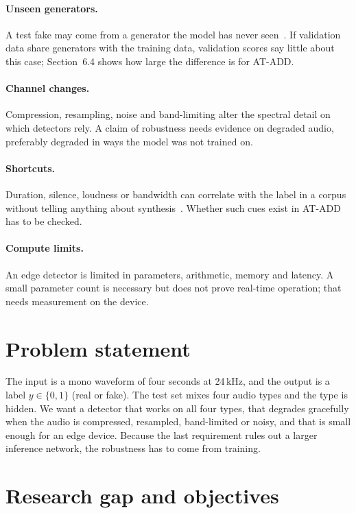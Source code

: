 \documentclass[12pt,a4paper]{report}
\begin{document}
\paragraph{Unseen generators.} A test fake may come from a generator the model has never seen~\cite{xie2026atadd}. If validation data share generators with the training data, validation scores say little about this case; Section~6.4 shows how large the difference is for AT-ADD.

\paragraph{Channel changes.} Compression, resampling, noise and band-limiting alter the spectral detail on which detectors rely. A claim of robustness needs evidence on degraded audio, preferably degraded in ways the model was not trained on.

\paragraph{Shortcuts.} Duration, silence, loudness or bandwidth can correlate with the label in a corpus without telling anything about synthesis~\cite{muller2021silver}. Whether such cues exist in AT-ADD has to be checked.

\paragraph{Compute limits.} An edge detector is limited in parameters, arithmetic, memory and latency. A small parameter count is necessary but does not prove real-time operation; that needs measurement on the device.

\section{Problem statement}

The input is a mono waveform of four seconds at 24\,kHz, and the output is a label $y\in\{0,1\}$ (real or fake). The test set mixes four audio types and the type is hidden. We want a detector that works on all four types, that degrades gracefully when the audio is compressed, resampled, band-limited or noisy, and that is small enough for an edge device. Because the last requirement rules out a larger inference network, the robustness has to come from training.

\section{Research gap and objectives}
\end{document}
